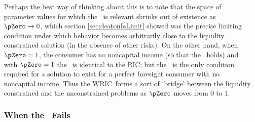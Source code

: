 \documentclass[BufferStockTheory]{subfiles}
\begin{document}
Perhaps the best way of thinking about this is to note that the space
of parameter values for which the \WRIC~is relevant shrinks out of
existence as $\pZero \rightarrow 0$, which section
\ref{sec:deatonIsLimit} showed was the precise limiting condition
under which behavior becomes arbitrarily close to the liquidity
constrained solution (in the absence of other risks).  On the other
hand, when $\pZero = 1$, the consumer has no noncapital income (so
that the \FHWC~holds) and with $\pZero=1$ the \WRIC~is identical to the
RIC; but the \RIC~is
the only condition required for a solution to exist
for a perfect foresight consumer with no noncapital income.  Thus the
WRIC~forms a sort of `bridge' between the liquidity constrained and
the unconstrained problems as $\pZero$ moves from 0 to 1.

\hypertarget{The-GIC}{}
\hypertarget{When-the-GIC-Fails}{}
\subsubsection{When the \GIC~Fails}
\end{document}
